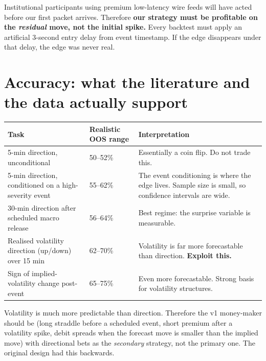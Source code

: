 \begin{warnbox}[title={The uncomfortable truth about latency}]
Institutional participants using premium low-latency wire feeds will have acted
before our first packet arrives. Therefore \textbf{our strategy must be
profitable on the \emph{residual} move, not the initial spike.} Every backtest
must apply an artificial 3-second entry delay from event timestamp. If the edge
disappears under that delay, the edge was never real.
\end{warnbox}

\section{Accuracy: what the literature and the data actually support}

\begin{longtable}{@{}p{4.6cm}p{3.4cm}p{6.6cm}@{}}
\toprule
\textbf{Task} & \textbf{Realistic OOS range} & \textbf{Interpretation}\\
\midrule
5-min direction, unconditional & 50--52\% & Essentially a coin flip. Do not
trade this.\\
5-min direction, conditioned on a high-severity event & 55--62\% & The event
conditioning is where the edge lives. Sample size is small, so confidence
intervals are wide.\\
30-min direction after scheduled macro release & 56--64\% & Best regime: the
surprise variable is measurable.\\
Realised volatility direction (up/down) over 15 min & 62--70\% & Volatility is
far more forecastable than direction. \textbf{Exploit this.}\\
Sign of implied-volatility change post-event & 65--75\% & Even more
forecastable. Strong basis for volatility structures.\\
\bottomrule
\end{longtable}

\begin{keybox}[title={Design implication that changes the whole product}]
Volatility is much more predictable than direction. Therefore the v1 money-maker
should be  (long straddle before a scheduled event,
short premium after a volatility spike, debit spreads when the forecast move is
smaller than the implied move) with directional bets as the \emph{secondary}
strategy, not the primary one. The original design had this backwards.
\end{keybox}

